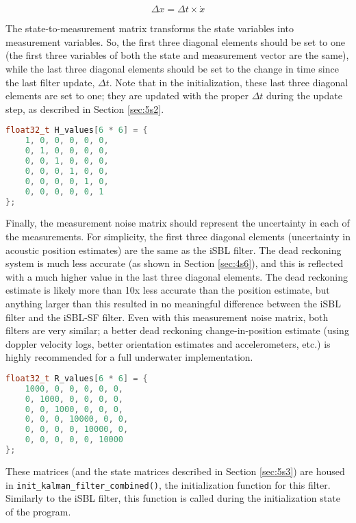 \documentclass[12pt,a4paper]{report}
\begin{document}
\begin{equation} \label{eq:isblsf2}
	\Delta x = \Delta t \times \dot{x}
\end{equation}

The state-to-measurement matrix transforms the state variables into measurement variables. So, the first three diagonal elements should be set to one (the first three variables of both the state and measurement vector are the same), while the last three diagonal elements should be set to the change in time since the last filter update, \(\Delta t\). Note that in the initialization, these last three diagonal elements are set to one; they are updated with the proper \(\Delta t\) during the update step, as described in Section \ref{sec:5s2}.

\begin{lstlisting}[language=C++]
float32_t H_values[6 * 6] = {
	1, 0, 0, 0, 0, 0,
	0, 1, 0, 0, 0, 0,
	0, 0, 1, 0, 0, 0,
	0, 0, 0, 1, 0, 0,
	0, 0, 0, 0, 1, 0,
	0, 0, 0, 0, 0, 1
};
\end{lstlisting}

Finally, the measurement noise matrix should represent the uncertainty in each of the measurements. For simplicity, the first three diagonal elements (uncertainty in acoustic position estimates) are the same as the iSBL filter. The dead reckoning system is much less accurate (as shown in Section \ref{sec:4s6}), and this is reflected with a much higher value in the last three diagonal elements. The dead reckoning estimate is likely more than 10x less accurate than the position estimate, but anything larger than this resulted in no meaningful difference between the iSBL filter and the iSBL-SF filter. Even with this measurement noise matrix, both filters are very similar; a better dead reckoning change-in-position estimate (using doppler velocity logs, better orientation estimates and accelerometers, etc.) is highly recommended for a full underwater implementation.

\begin{lstlisting}[language=C++]
float32_t R_values[6 * 6] = {
	1000, 0, 0, 0, 0, 0,
	0, 1000, 0, 0, 0, 0,
	0, 0, 1000, 0, 0, 0,
	0, 0, 0, 10000, 0, 0,
	0, 0, 0, 0, 10000, 0,
	0, 0, 0, 0, 0, 10000
};
\end{lstlisting}

These matrices (and the state matrices described in Section \ref{sec:5s3}) are housed in \verb|init_kalman_filter_combined()|, the initialization function for this filter. Similarly to the iSBL filter, this function is called during the initialization state of the program.
\end{document}
